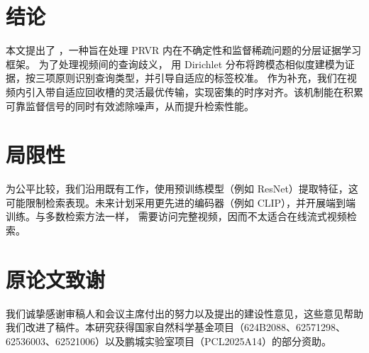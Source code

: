 \section{结论}
\label{sec:conclusion}
本文提出了 \modelname{}，一种旨在处理 PRVR 内在不确定性和监督稀疏问题的分层证据学习框架。
为了处理视频间的查询歧义，\modelname{} 用 Dirichlet 分布将跨模态相似度建模为证据，按三项原则识别查询类型，并引导自适应的标签校准。
作为补充，我们在视频内引入带自适应回收槽的灵活最优传输，实现密集的时序对齐。该机制能在积累可靠监督信号的同时有效滤除噪声，从而提升检索性能。

\section*{局限性}
为公平比较，我们沿用既有工作，使用预训练模型（例如 ResNet）提取特征，这可能限制检索表现。未来计划采用更先进的编码器（例如 CLIP），并开展端到端训练。与多数检索方法一样，\modelname{} 需要访问完整视频，因而不太适合在线流式视频检索。

\section*{原论文致谢}
我们诚挚感谢审稿人和会议主席付出的努力以及提出的建设性意见，这些意见帮助我们改进了稿件。本研究获得国家自然科学基金项目（624B2088、62571298、62536003、62521006）以及鹏城实验室项目（PCL2025A14）的部分资助。
